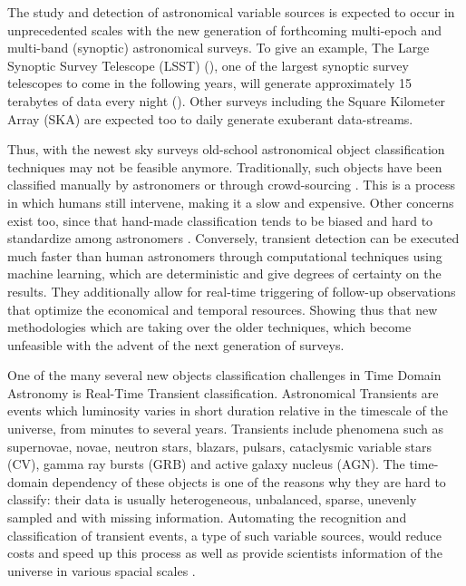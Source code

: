 
The study and detection of astronomical variable sources is expected to occur in unprecedented scales with the new generation of forthcoming multi-epoch and multi-band (synoptic) astronomical surveys. To give an example, The Large Synoptic Survey Telescope (LSST) (\cite{0805.2366}), one of the largest synoptic survey telescopes to come in the following years, will generate approximately 15 terabytes of data every night (\cite{1512.07914}). 
Other surveys including the Square Kilometer Array (SKA) are expected too to daily generate exuberant data-streams.

Thus, with the newest sky surveys old-school astronomical object classification techniques may not be feasible anymore. Traditionally, such objects have been classified manually by astronomers or through crowd-sourcing \cite{1011.2199} \cite{0708.2750}. This is a process in which humans still intervene, making it a slow and expensive. Other concerns exist too, since that hand-made classification tends to be biased and hard to standardize among astronomers \cite{1104.3142}. Conversely, transient detection can be executed much faster than human astronomers through computational techniques using machine learning, which are deterministic and give degrees of certainty on the results. They additionally allow for real-time triggering of follow-up observations that optimize the economical and temporal resources. Showing thus that new methodologies which are taking over the older techniques, which become unfeasible with the advent of the next generation of surveys. 


One of the many several new objects classification challenges in Time Domain Astronomy is Real-Time Transient classification. Astronomical Transients are events which luminosity varies in short duration relative in the timescale of the universe, from minutes to several years. Transients include phenomena such as supernovae, novae, neutron stars, blazars, pulsars, cataclysmic variable stars (CV), gamma ray bursts (GRB) and active galaxy nucleus (AGN). The time-domain dependency of these objects is one of the reasons why they are hard to classify: their data is usually heterogeneous, unbalanced, sparse, unevenly sampled and with missing information. Automating the recognition and classification of transient events, a type of such variable sources, would reduce costs and speed up this process as well as provide scientists information of the universe in various spacial scales \cite{2011arXiv1110.4655D}.

